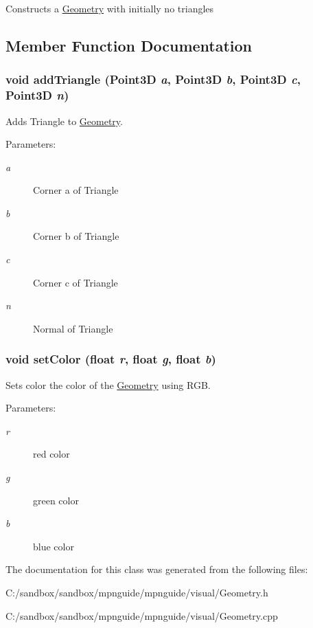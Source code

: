 Constructs a \hyperlink{class_geometry}{Geometry} with initially no triangles 

\subsection{Member Function Documentation}
\hypertarget{class_geometry_b4ead4f0144f2780838c99ea231ae312}{
\subsubsection[{addTriangle}]{\setlength{\rightskip}{0pt plus 5cm}void addTriangle (Point3D {\em a}, \/  Point3D {\em b}, \/  Point3D {\em c}, \/  Point3D {\em n})}}
\label{class_geometry_b4ead4f0144f2780838c99ea231ae312}


Adds Triangle to \hyperlink{class_geometry}{Geometry}. 

\begin{Desc}
\item[Parameters:]
\begin{description}
\item[{\em a}]Corner a of Triangle \item[{\em b}]Corner b of Triangle \item[{\em c}]Corner c of Triangle \item[{\em n}]Normal of Triangle \end{description}
\end{Desc}
\hypertarget{class_geometry_ecfe13058d31edaa7fa94efc6b5503f7}{
\subsubsection[{setColor}]{\setlength{\rightskip}{0pt plus 5cm}void setColor (float {\em r}, \/  float {\em g}, \/  float {\em b})}}
\label{class_geometry_ecfe13058d31edaa7fa94efc6b5503f7}


Sets color the color of the \hyperlink{class_geometry}{Geometry} using RGB. 

\begin{Desc}
\item[Parameters:]
\begin{description}
\item[{\em r}]red color \item[{\em g}]green color \item[{\em b}]blue color \end{description}
\end{Desc}


The documentation for this class was generated from the following files:\begin{CompactItemize}
\item 
C:/sandbox/sandbox/mpnguide/mpnguide/visual/Geometry.h\item 
C:/sandbox/sandbox/mpnguide/mpnguide/visual/Geometry.cpp\end{CompactItemize}
